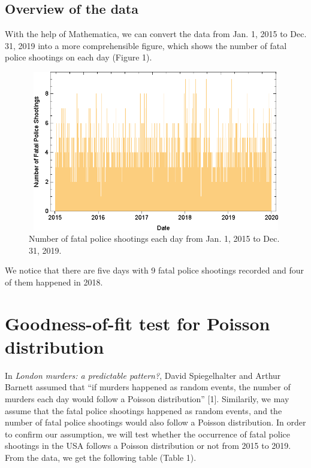 \documentclass[a4paper]{article}
\begin{document}
	\subsection{Overview of the data}
	With the help of Mathematica, we can convert the data from Jan. 1, 2015 to Dec. 31, 2019 into a more comprehensible figure, which shows the number of fatal police shootings on each day (Figure 1).
	
	\begin{figure}[H]
	\centering
	\includegraphics[height=7cm,width=14cm]{Overall(2).eps}
	\caption{Number of fatal police shootings each day from Jan. 1, 2015 to Dec. 31, 2019.}
	\end{figure}

	We notice that there are five days with 9 fatal police shootings recorded and four of them happened in 2018.

\section{Goodness-of-fit test for Poisson distribution}
	In \textit{London murders: a predictable pattern?}, David Spiegelhalter and Arthur Barnett assumed that “if murders happened as random events, the number of murders each day would follow a Poisson distribution” [1]. Similarily, we may assume that the fatal police shootings happened as random events, and the number of fatal police shootings would also follow a Poisson distribution. In order to confirm our assumption, we will test whether the occurrence of fatal police shootings in the USA follows a Poisson distribution or not from 2015 to 2019. From the data, we get the following table (Table 1).
\end{document}
